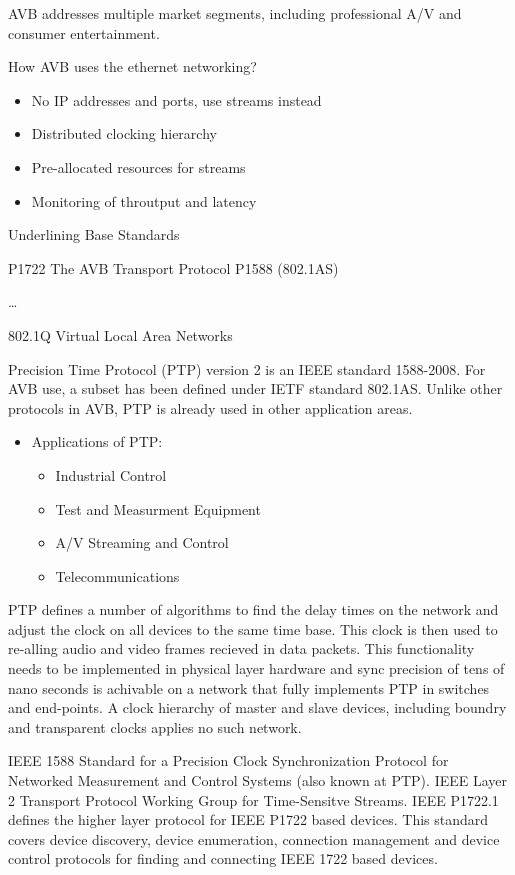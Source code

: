 { AVB addresses multiple market segments, including professional A/V and consumer entertainment. }

How AVB uses the ethernet networking?

\begin{itemize}
	\item No IP addresses and ports, use streams instead
	\item Distributed clocking hierarchy
	\item Pre-allocated resources for streams
	\item Monitoring of throutput and latency
\end{itemize}

{ Underlining Base Standards }

	\item P1722 The AVB Transport Protocol
	\time P1588 (802.1AS)

\item \dots

802.1Q Virtual Local Area Networks


{ Precision Time Protocol (PTP) version 2 is an IEEE standard 1588-2008.
For AVB use, a subset has been defined under IETF standard 802.1AS.
Unlike other protocols in AVB, PTP is already used in other application areas.}
\begin{itemize}
	\item Applications of PTP:
	\begin{itemize}
		\item Industrial Control
		\item Test and Measurment Equipment
		\item A/V Streaming and Control
		\item Telecommunications
	\end{itemize}
\end{itemize}

{ PTP defines a number of algorithms to find the delay times on the network
and adjust the clock on all devices to the same time base. This clock is then
used to re-alling audio and video frames recieved in data packets.
This functionality needs to be implemented in physical layer hardware and
sync precision of tens of nano seconds is achivable on a network that fully
implements PTP in switches and end-points. A clock hierarchy of master and
slave devices, including boundry and transparent clocks applies no such network. }

{ IEEE 1588 Standard for a Precision Clock Synchronization Protocol for Networked Measurement and Control Systems (also known at PTP). }
{ IEEE Layer 2 Transport Protocol Working Group for Time-Sensitve Streams. }
{ IEEE P1722.1 defines the higher layer protocol for IEEE P1722 based devices.
This standard covers device discovery, device enumeration, connection management
and device control protocols for finding and connecting IEEE 1722 based devices. }


